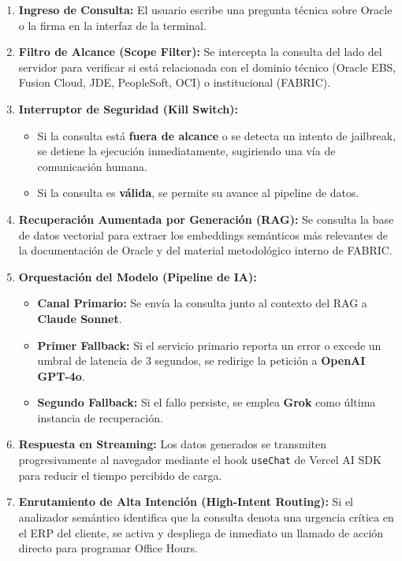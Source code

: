 \documentclass[11pt,letterpaper]{article}
\begin{document}
\begin{enumerate}
\item \textbf{Ingreso de Consulta:} El usuario escribe una pregunta técnica sobre Oracle o la firma en la interfaz de la terminal.
\item \textbf{Filtro de Alcance (Scope Filter):} Se intercepta la consulta del lado del servidor para verificar si está relacionada con el dominio técnico (Oracle EBS, Fusion Cloud, JDE, PeopleSoft, OCI) o institucional (FABRIC).
\item \textbf{Interruptor de Seguridad (Kill Switch):}
  \begin{itemize}
  \item Si la consulta está \textbf{fuera de alcance} o se detecta un intento de jailbreak, se detiene la ejecución inmediatamente, sugiriendo una vía de comunicación humana.
  \item Si la consulta es \textbf{válida}, se permite su avance al pipeline de datos.
  \end{itemize}
\item \textbf{Recuperación Aumentada por Generación (RAG):} Se consulta la base de datos vectorial para extraer los embeddings semánticos más relevantes de la documentación de Oracle y del material metodológico interno de FABRIC.
\item \textbf{Orquestación del Modelo (Pipeline de IA):}
  \begin{itemize}
  \item \textbf{Canal Primario:} Se envía la consulta junto al contexto del RAG a \textbf{Claude Sonnet}.
  \item \textbf{Primer Fallback:} Si el servicio primario reporta un error o excede un umbral de latencia de 3 segundos, se redirige la petición a \textbf{OpenAI GPT-4o}.
  \item \textbf{Segundo Fallback:} Si el fallo persiste, se emplea \textbf{Grok} como última instancia de recuperación.
  \end{itemize}
\item \textbf{Respuesta en Streaming:} Los datos generados se transmiten progresivamente al navegador mediante el hook \texttt{useChat} de Vercel AI SDK para reducir el tiempo percibido de carga.
\item \textbf{Enrutamiento de Alta Intención (High-Intent Routing):} Si el analizador semántico identifica que la consulta denota una urgencia crítica en el ERP del cliente, se activa y despliega de inmediato un llamado de acción directo para programar Office Hours.
\end{enumerate}
\end{document}
